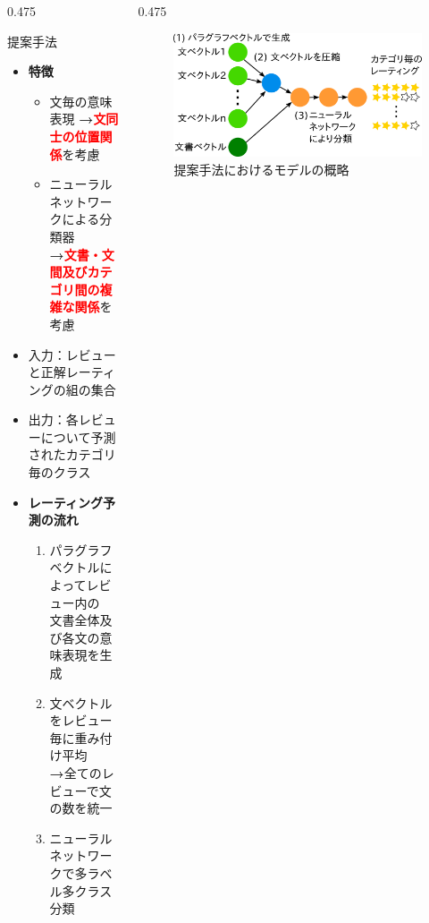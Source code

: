 \documentclass[unicode,10pt]{beamer}
\newcommand{\arrow}{\textcolor{ttiblue}{\textbf{→}}\hspace{1ex}}
\newcommand{\itemtitle}[1]{\textbf{#1}\\}
\newcommand{\fire}[1]{\textcolor{red}{\textbf{#1}}}
\newcommand{\columnsize}{0.475\textwidth}
\begin{document}
\begin{frame}
\begin{columns}[onlytextwidth,t]
\begin{column}{\columnsize}
  \begin{block}{提案手法}
    \begin{itemize}
      \item \itemtitle{特徴}
        \begin{itemize}
          \item 文毎の意味表現 \arrow \fire{文同士の位置関係}を考慮
          \item ニューラルネットワークによる分類器 \\
                \arrow \fire{文書・文間及びカテゴリ間の複雑な関係}を考慮
        \end{itemize}
      \item 入力：レビューと正解レーティングの組の集合
      \item 出力：各レビューについて予測されたカテゴリ毎のクラス
      \item \itemtitle{レーティング予測の流れ}
        \begin{enumerate}
          \item パラグラフベクトルによってレビュー内の \\
                文書全体及び各文の意味表現を生成
          \item 文ベクトルをレビュー毎に重み付け平均 \\
                \arrow 全てのレビューで文の数を統一
          \item ニューラルネットワークで多ラベル多クラス分類
        \end{enumerate}
    \end{itemize}
  \end{block}
\end{column}

\begin{column}{\columnsize}
  \begin{figure}
    \includegraphics[width=\linewidth]{fig/model_on_poster.png}
    \caption{提案手法におけるモデルの概略}
  \end{figure}


\end{column}
\end{columns}
\end{frame}
\end{document}
